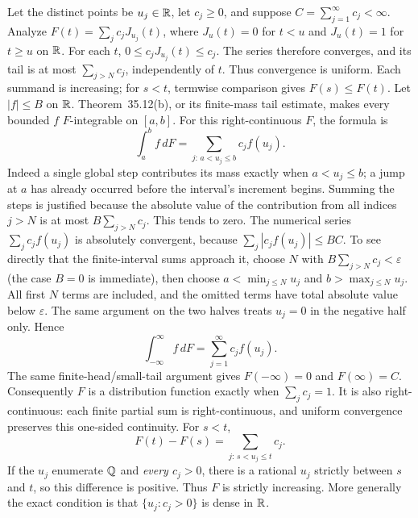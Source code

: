 \goal Let the distinct points be $u_j\in\mathbb{R}$, let $c_j\geq0$, and
suppose $C=\sum_{j=1}^\infty c_j<\infty$. Analyze
$F(t)=\sum_j c_j J_{u_j}(t)$, where $J_u(t)=0$ for $t<u$ and
$J_u(t)=1$ for $t\geq u$ on $\mathbb{R}$.
For each $t$, $0\leq c_jJ_{u_j}(t)\leq c_j$. The series therefore
converges, and its tail is at most $\sum_{j>N}c_j$, independently
of $t$. Thus convergence is uniform. Each summand is increasing;
for $s<t$, termwise comparison gives $F(s)\leq F(t)$.
Let $|f|\leq B$ on $\mathbb{R}$. Theorem~35.12(b), or its finite-mass
tail estimate, makes every bounded $f$ $F$-integrable on $[a,b]$.
For this right-continuous $F$, the formula is
\[
 \int_a^b f\,dF=\sum_{j:\,a<u_j\leq b}c_j f(u_j).
\]
Indeed a single global step contributes its mass exactly when
$a<u_j\leq b$; a jump at $a$ has already occurred before the
interval's increment begins. Summing the steps is justified because
the absolute value of the contribution from all indices $j>N$ is
at most $B\sum_{j>N}c_j$. This tends to zero.
The numerical series $\sum_j c_jf(u_j)$ is absolutely convergent,
because $\sum_j|c_jf(u_j)|\leq BC$. To see directly that the
finite-interval sums approach it, choose $N$ with
$B\sum_{j>N}c_j<\varepsilon$ (the case $B=0$ is immediate),
then choose $a<\min_{j\leq N}u_j$ and
$b>\max_{j\leq N}u_j$. All first $N$ terms are included, and
the omitted terms have total absolute value below $\varepsilon$.
The same argument on the two halves treats $u_j=0$ in the negative
half only. Hence
\[
 \int_{-\infty}^{\infty}f\,dF=\sum_{j=1}^\infty c_jf(u_j).
\]
The same finite-head/small-tail argument gives
$F(-\infty)=0$ and $F(\infty)=C$. Consequently $F$ is a
distribution function exactly when $\sum_jc_j=1$. It is also
right-continuous: each finite partial sum is right-continuous,
and uniform convergence preserves this one-sided continuity.
For $s<t$,
\[
 F(t)-F(s)=\sum_{j:\,s<u_j\leq t}c_j.
\]
If the $u_j$ enumerate $\mathbb{Q}$ and \emph{every $c_j>0$}, there is a
rational $u_j$ strictly between $s$ and $t$, so this difference is
positive. Thus $F$ is strictly increasing. More generally the exact
condition is that $\{u_j:c_j>0\}$ is dense in $\mathbb{R}$.

